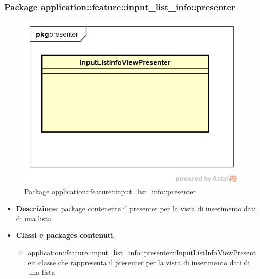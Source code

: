 \subsubsection{Package application::feature::input\_list\_info::presenter}
\label{Package application::feature::input_list_info::presenter}
\begin{figure}[H]
	\centering
	\includegraphics[scale=0.5]{Sezioni/Packages/Application/input_list_info_presenter.png}
	\caption{Package application::feature::input\_list\_info::presenter}
\end{figure}
\begin{itemize}
	\item \textbf{Descrizione}: package contenente il presenter per la vista di inserimento dati di una lista
	\item \textbf{Classi e packages contenuti}:
	\begin{itemize}
	\item application::feature::input\_list\_info::presenter::InputListInfoViewPresenter: classe che rappresenta il presenter per la vista di inserimento dati di una lista
	\end{itemize}
\end{itemize}


